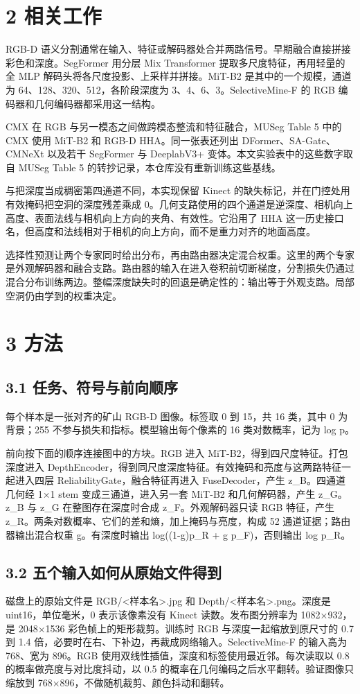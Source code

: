 \documentclass[UTF8,a4paper,11pt]{ctexart}
\begin{document}
\section*{2 相关工作}
RGB-D 语义分割通常在输入、特征或解码器处合并两路信号。早期融合直接拼接彩色和深度。SegFormer 用分层 Mix Transformer 提取多尺度特征，再用轻量的全 MLP 解码头将各尺度投影、上采样并拼接。MiT-B2 是其中的一个规模，通道为 64、128、320、512，各阶段深度为 3、4、6、3。SelectiveMine-F 的 RGB 编码器和几何编码器都采用这一结构。

CMX 在 RGB 与另一模态之间做跨模态整流和特征融合，MUSeg Table 5 中的 CMX 使用 MiT-B2 和 RGB-D HHA。同一张表还列出 DFormer、SA-Gate、CMNeXt 以及若干 SegFormer 与 DeeplabV3+ 变体。本文实验表中的这些数字取自 MUSeg Table 5 的转抄记录，本仓库没有重新训练这些基线。

与把深度当成稠密第四通道不同，本实现保留 Kinect 的缺失标记，并在门控处用有效掩码把空洞的深度残差乘成 0。几何支路使用的四个通道是逆深度、相机向上高度、表面法线与相机向上方向的夹角、有效性。它沿用了 HHA 这一历史接口名，但高度和法线相对于相机的向上方向，而不是重力对齐的地面高度。

选择性预测让两个专家同时给出分布，再由路由器决定混合权重。这里的两个专家是外观解码器和融合支路。路由器的输入在进入卷积前切断梯度，分割损失仍通过混合分布训练两边。整幅深度缺失时的回退是确定性的：输出等于外观支路。局部空洞仍由学到的权重决定。

\section*{3 方法}
\subsection*{3.1 任务、符号与前向顺序}
每个样本是一张对齐的矿山 RGB-D 图像。标签取 0 到 15，共 16 类，其中 0 为背景；255 不参与损失和指标。模型输出每个像素的 16 类对数概率，记为 log p。

前向按下面的顺序连接图中的方块。RGB 进入 MiT-B2，得到四尺度特征。打包深度进入 DepthEncoder，得到同尺度深度特征。有效掩码和亮度与这两路特征一起进入四层 ReliabilityGate，融合特征再进入 FuseDecoder，产生 z\_B。四通道几何经 1×1 stem 变成三通道，进入另一套 MiT-B2 和几何解码器，产生 z\_G。z\_B 与 z\_G 在整图存在深度时合成 z\_F。外观解码器只读 RGB 特征，产生 z\_R。两条对数概率、它们的差和熵，加上掩码与亮度，构成 52 通道证据；路由器输出混合权重 g。有深度时输出 log((1-g)p\_R + g p\_F)，否则输出 log p\_R。

\subsection*{3.2 五个输入如何从原始文件得到}
磁盘上的原始文件是 RGB/<样本名>.jpg 和 Depth/<样本名>.png。深度是 uint16，单位毫米，0 表示该像素没有 Kinect 读数。发布图分辨率为 1082×932，是 2048×1536 彩色帧上的矩形裁剪。训练时 RGB 与深度一起缩放到原尺寸的 0.7 到 1.4 倍，必要时在右、下补边，再裁成网络输入。SelectiveMine-F 的输入高为 768、宽为 896。RGB 使用双线性插值，深度和标签使用最近邻。每次读取以 0.8 的概率做亮度与对比度抖动，以 0.5 的概率在几何编码之后水平翻转。验证图像只缩放到 768×896，不做随机裁剪、颜色抖动和翻转。
\end{document}
